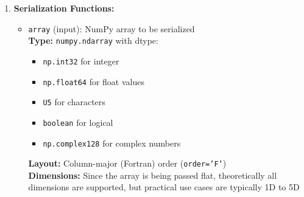 \documentclass[11pt]{article}
\begin{document}
\begin{enumerate}
\begin{enumerate}
\begin{itemize}
	      	      	\item \texttt{tox\_deserialize\_logical\_nd(filename)} - Deserialize
	      	      	      N-dimensional logical arrays.
	      	      	      
	      	      	\item \texttt{tox\_serialize\_complex\_nd(array, filename)} -
	      	      	      Serialize N-dimensional complex arrays.
	      	      	      
	      	      	\item \texttt{tox\_deserialize\_complex\_nd(filename)} - Deserialize
	      	      	      N-dimensional complex arrays.
	      	      	      
	      	      	\item \texttt{get\_array\_metadata(filename)} - Retrieve array
	      	      	      dimensions and metadata
	      	      \end{itemize}
	      	      
	      	\item \textbf{Serialization Functions:}
	      	      \begin{itemize}
	      	      	\item \texttt{array} (input): NumPy array to be serialized \\ \textbf{Type:}
	      	      	      \texttt{numpy.ndarray} with dtype:
	      	      	      \begin{itemize}
	      	      	      	\item \texttt{np.int32} for integer
	      	      	      	      
	      	      	      	\item \texttt{np.float64} for float values
	      	      	      	      
	      	      	      	\item \texttt{U5} for characters
	      	      	      	      
	      	      	      	\item \texttt{boolean} for logical
	      	      	      	      
	      	      	      	\item \texttt{np.complex128} for complex numbers
	      	      	      \end{itemize}
	      	      	      \textbf{Layout:} Column-major (Fortran) order (\texttt{order='F'})
	      	      	      \\ \textbf{Dimensions:} Since the array is being passed flat,
	      	      	      theoretically all dimensions are supported, but practical use cases
	      	      	      are typically 1D to 5D
	      	      	      

\end{itemize}
\end{enumerate}
\end{enumerate}
\end{document}
